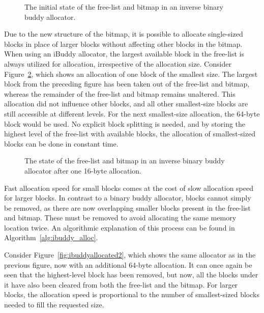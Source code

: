 \begin{figure}[h]
  \centering
  
  \caption{The initial state of the free-list and bitmap in an inverse binary buddy allocator.}
  \label{fig:ibuddyinitial}
\end{figure}

\newpage
Due to the new structure of the bitmap, it is possible to allocate single-sized blocks in place of larger blocks without affecting other blocks in the bitmap. When using an iBuddy allocator, the largest available block in the free-list is always utilized for allocation, irrespective of the allocation size. Consider Figure~\ref{fig:ibuddyallocated}, which shows an allocation of one block of the smallest size. The largest block from the preceding figure has been taken out of the free-list and bitmap, whereas the remainder of the free-list and bitmap remains unaltered. This allocation did not influence other blocks, and all other smallest-size blocks are still accessible at different levels. For the next smallest-size allocation, the 64-byte block would be used. No explicit block splitting is needed, and by storing the highest level of the free-list with available blocks, the allocation of smallest-sized blocks can be done in constant time.

\begin{figure}[h]
  \centering
  
  \caption{The state of the free-list and bitmap in an inverse binary buddy allocator after one
    16-byte allocation.}
  \label{fig:ibuddyallocated}
\end{figure}

Fast allocation speed for small blocks comes at the cost of slow allocation speed for larger blocks. In contrast to a binary buddy allocator, blocks cannot simply be removed, as there are now overlapping smaller blocks present in the free-list and bitmap. These must be removed to avoid allocating the same memory location twice. An algorithmic explanation of this process can be found in Algorithm~\ref{alg:ibuddy_alloc}.

Consider Figure~\ref{fig:ibuddyallocated2}, which shows the same allocator as in the previous figure, now with an additional 64-byte allocation. It can once again be seen that the highest-level block has been removed, but now, all the blocks under it have also been cleared from both the free-list and the bitmap. For larger blocks, the allocation speed is proportional to the number of smallest-sized blocks needed to fill the requested size.

